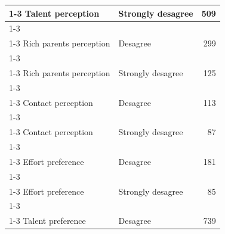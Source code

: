 \documentclass[
  spanish,
  a4paper,
  oneside]{scrbook}
\begin{document}
\begin{table}
{\begin{tabular}[t]{llr}
\cmidrule{1-3}
\hspace{1em}Talent perception & Strongly desagree & 509\\
\cmidrule{1-3}
\hspace{1em}\cellcolor{gray!10}{Rich parents perception} & \cellcolor{gray!10}{Agree} & \cellcolor{gray!10}{1135}\\
\cmidrule{1-3}
\hspace{1em}Rich parents perception & Desagree & 299\\
\cmidrule{1-3}
\hspace{1em}\cellcolor{gray!10}{Rich parents perception} & \cellcolor{gray!10}{Strongly agree} & \cellcolor{gray!10}{1797}\\
\cmidrule{1-3}
\hspace{1em}Rich parents perception & Strongly desagree & 125\\
\cmidrule{1-3}
\hspace{1em}\cellcolor{gray!10}{Contact perception} & \cellcolor{gray!10}{Agree} & \cellcolor{gray!10}{1216}\\
\cmidrule{1-3}
\hspace{1em}Contact perception & Desagree & 113\\
\cmidrule{1-3}
\hspace{1em}\cellcolor{gray!10}{Contact perception} & \cellcolor{gray!10}{Strongly agree} & \cellcolor{gray!10}{1973}\\
\cmidrule{1-3}
\hspace{1em}Contact perception & Strongly desagree & 87\\
\cmidrule{1-3}
\hspace{1em}\cellcolor{gray!10}{Effort preference} & \cellcolor{gray!10}{Agree} & \cellcolor{gray!10}{1236}\\
\cmidrule{1-3}
\hspace{1em}Effort preference & Desagree & 181\\
\cmidrule{1-3}
\hspace{1em}\cellcolor{gray!10}{Effort preference} & \cellcolor{gray!10}{Strongly agree} & \cellcolor{gray!10}{1839}\\
\cmidrule{1-3}
\hspace{1em}Effort preference & Strongly desagree & 85\\
\cmidrule{1-3}
\hspace{1em}\cellcolor{gray!10}{Talent preference} & \cellcolor{gray!10}{Agree} & \cellcolor{gray!10}{1408}\\
\cmidrule{1-3}
\hspace{1em}Talent preference & Desagree & 739\\

\end{tabular}}
\end{table}
\end{document}
